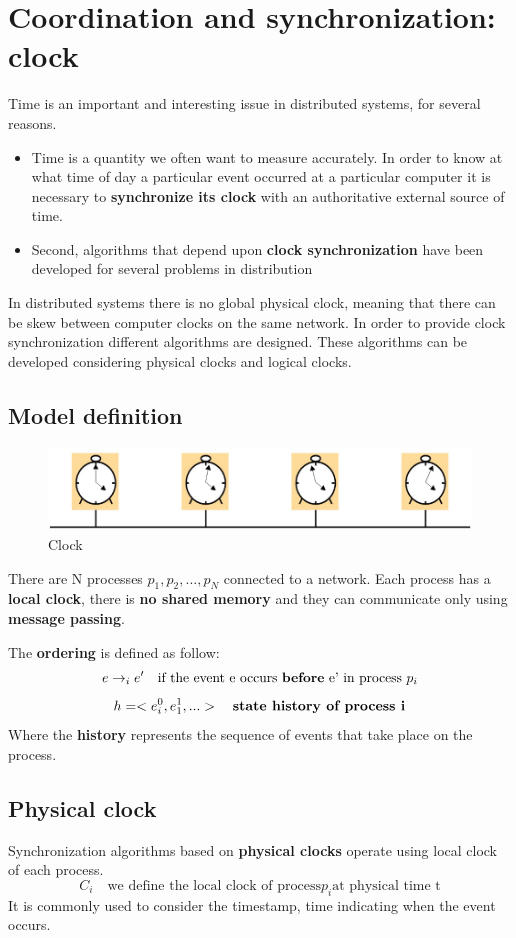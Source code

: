 \chapter{Coordination and synchronization: clock}
Time is an important and interesting issue in distributed systems, for several reasons.
\begin{itemize}
    \item Time is a quantity we often want to measure accurately. In order to know at what time of day a particular event occurred at a particular computer it is necessary to \textbf{synchronize its clock} with an authoritative external source of time.
    \item Second, algorithms that depend upon \textbf{clock synchronization} have been developed for several problems in distribution
\end{itemize}
In distributed systems there is no global physical clock, meaning that there can be skew between computer clocks on the same network. In order to provide clock synchronization different algorithms are designed. These algorithms can be developed considering physical clocks and logical clocks.

\section{Model definition}

\begin{figure}[!h]
    \centering
    \includegraphics[width=.70\linewidth]{images/Clock/clocks.png}
    \caption{Clock}
\end{figure}

There are N processes \(p_1,p_2,...,p_N\) connected to a network. Each process has a \textbf{local clock}, there is \textbf{no shared memory} and they can communicate only using \textbf{message passing}.

The \textbf{ordering} is defined as follow:
\[e \rightarrow_i e' \quad \textrm{if the event e occurs \textbf{before} e' in process } p_i\]
\[h = <e_i^0,e_1^1,...> \quad \textrm{\textbf{state history of process i}}\]
Where the \textbf{history} represents the sequence of events that take place on the process.

\section{Physical clock}
Synchronization algorithms based on \textbf{physical clocks} operate using local clock of each process.
\[C_i \quad \textrm{we define the local clock of process} p_i \textrm{at physical time t}\]
It is commonly used to consider the timestamp, time indicating when the event occurs.

